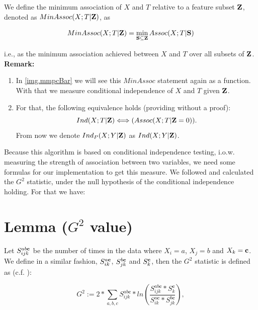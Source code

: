 		We define the minimum association of $X$ and $T$ relative to a feature subset ${\textbf{Z}}$, denoted as $MinAssoc(X; T | {\textbf{Z}})$, as

		\begin{equation}
			MinAssoc (X; T | {\textbf{Z}}) = \min_{{\textbf{S}} \subseteq {\textbf{Z}}} Assoc(X; T | {\textbf{S}})
		\end{equation}

		i.e., as the minimum association achieved between $X$ and $T$ over all subsets of ${\textbf{Z}}$. \\
		\textbf{Remark:}
		\begin{enumerate}
			\item In \autoref{img.mmpcBar} we will see this $MinAssoc$ statement again as a function. With that we measure conditional independence of $X$ and $T$ given ${\textbf{Z}}$.
			\item For that, the following equivalence holds (providing without a proof): 
				\begin{equation}
					Ind(X; T | {\textbf{Z}}) \Longleftrightarrow (Assoc(X; T | {\textbf{Z}} = 0)).
				\end{equation}
				From now we denote $Ind_{P}(X; Y | {\textbf{Z}})$ as $Ind(X; Y | {\textbf{Z}})$.
		\end{enumerate}

	Because this algorithm is based on conditional independence testing, i.o.w. measuring the strength of association between two variables, we need some formulas for our implementation to get this measure. We followed \cite{SGSN} and calculated the $G^{2}$ statistic, under the null hypothesis of the conditional independence holding. For that we have:\\

	\section*{Lemma ($G^{2}$ value)} \label{s.g2}

		Let $S_{ijk}^{ab{\textbf{c}}}$ be the number of times in the data where $X_{i} = a$, $X_{j} = b$ and $X_{k} = {\textbf{c}}$. We define in a similar fashion, $S_{ik}^{a{\textbf{c}}}$, $S_{jk}^{b{\textbf{c}}}$  and $S_{k}^{{\textbf{c}}}$, then the $G^{2}$ statistic is defined as (c.f. \cite{SGSN}):

		\begin{equation}
			G^{2} := 2 * \sum_{a,b,c} S^{ab\textbf{c}}_{ijk} * ln \left( \frac{S^{ab\textbf{c}}_{ijk}*S^{\textbf{c}}_{k}}{S^{a\textbf{c}}_{ik}*S^{b\textbf{c}}_{jk}} \right),
		\end{equation}


